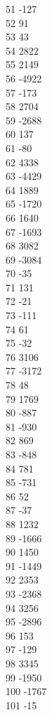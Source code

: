 { 51	-127 \\
 52	91 \\
 53	43 \\
 54	2822 \\
 55	2149 \\
 56	-4922 \\
 57	-173 \\
 58	2704 \\
 59	-2688 \\
 60	137 \\
 61	-80 \\
 62	4338 \\
 63	-4429 \\
 64	1889 \\
 65	-1720 \\
 66	1640 \\
 67	-1693 \\
 68	3082 \\
 69	-3084 \\
 70	-35 \\
 71	131 \\
 72	-21 \\
 73	-111 \\
 74	61 \\
 75	-32 \\
 76	3106 \\
 77	-3172 \\
 78	48 \\
 79	1769 \\
 80	-887 \\
 81	-930 \\
 82	869 \\
 83	-848 \\
 84	781 \\
 85	-731 \\
 86	52 \\
 87	-37 \\
 88	1232 \\
 89	-1666 \\
 90	1450 \\
 91	-1449 \\
 92	2353 \\
 93	-2368 \\
 94	3256 \\
 95	-2896 \\
 96	153 \\
 97	-129 \\
 98	3345 \\
 99	-1950 \\
 100	-1767 \\
 101	-15 \\
}
